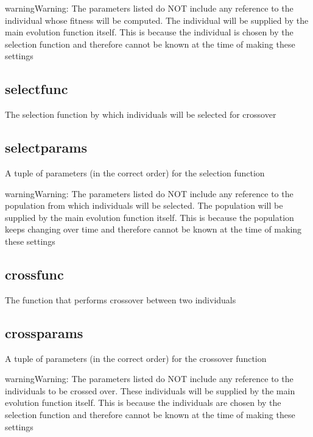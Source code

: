 \documentclass[letterpaper,10pt,english]{sphinxmanual}
\begin{document}
\begin{notice}{warning}{Warning:}
The parameters listed do NOT include any reference to the individual whose fitness will be computed. The individual will be supplied by the main evolution function itself. This is because the individual is chosen by the selection function and therefore cannot be known at the time of making these settings
\end{notice}


\subsection{selectfunc}
\label{settings.py:selectfunc}
The selection function by which individuals will be selected for crossover


\subsection{selectparams}
\label{settings.py:selectparams}
A tuple of parameters (in the correct order) for the selection function

\begin{notice}{warning}{Warning:}
The parameters listed do NOT include any reference to the population from which individuals will be selected. The population will be supplied by the main evolution function itself. This is because the population keeps changing over time and therefore cannot be known at the time of making these settings
\end{notice}


\subsection{crossfunc}
\label{settings.py:crossfunc}
The function that performs crossover between two individuals


\subsection{crossparams}
\label{settings.py:crossparams}
A tuple of parameters (in the correct order) for the crossover function

\begin{notice}{warning}{Warning:}
The parameters listed do NOT include any reference to the individuals to be crossed over. These individuals will be supplied by the main evolution function itself. This is because the individuals are chosen by the selection function and therefore cannot be known at the time of making these settings
\end{notice}
\end{document}
